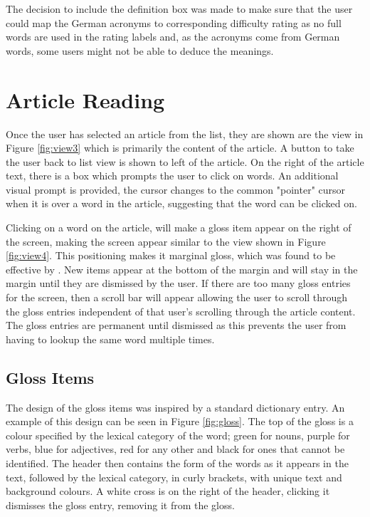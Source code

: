 The decision to include the definition box was made to make sure that the user could map the German acronyms to corresponding difficulty rating as no full words are used in the rating labels and, as the acronyms come from German words, some users might not be able to deduce the meanings.  

\section{Article Reading}

Once the user has selected an article from the list, they are shown are the view in Figure \ref{fig:view3} which is primarily the content of the article. A button to take the user back to list view is shown to left of the article. On the right of the article text, there is a box which prompts the user to click on words. An additional visual prompt is provided, the cursor changes to the common "pointer" cursor when it is over a word in the article, suggesting that the word can be clicked on.



Clicking on a word on the article, will make a gloss item appear on the right of the screen, making the screen appear similar to the view shown in Figure \ref{fig:view4}. This positioning makes it marginal gloss, which was found to be effective by \autocite{abuseileek2008}. New items appear at the bottom of the margin and will stay in the margin until they are dismissed by the user. If there are too many gloss entries for the screen, then a scroll bar will appear allowing the user to scroll through the gloss entries independent of that user's scrolling through the article content. The gloss entries are permanent until dismissed as this prevents the user from having to lookup the same word multiple times.


 
\subsection{Gloss Items}



The design of the gloss items was inspired by a standard dictionary entry. An example of this design can be seen in Figure \ref{fig:gloss}. The top of the gloss is a colour specified by the lexical category of the word; green for nouns, purple for verbs, blue for adjectives, red for any other and black for ones that cannot be identified. The header then contains the form of the words as it appears in the text, followed by the lexical category, in curly brackets, with unique text and background colours. A white cross is on the right of the header, clicking it dismisses the gloss entry, removing it from the gloss. 

